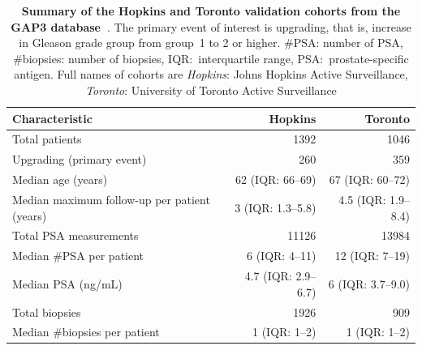 \begin{subappendices}
\begin{table}
\small
\centering
\caption{\textbf{Summary of the Hopkins and Toronto validation cohorts from the GAP3 database~\citep{gap3_2018}}. The primary event of interest is upgrading, that is, increase in Gleason grade group from group~1 to 2 or higher. \#PSA: number of PSA, \#biopsies: number of biopsies, IQR:~interquartile range, PSA:~prostate-specific antigen. Full names of cohorts are \textit{Hopkins}: Johns Hopkins Active Surveillance, \textit{Toronto}: University of Toronto Active Surveillance}
\label{c5:tab:gap3_summary_1}
\begin{tabular}{p{5cm}rr}
\hline
\textbf{Characteristic} & \textbf{Hopkins} & \textbf{Toronto}\\
\hline
Total patients & 1392 & 1046\\
Upgrading (primary event) & 260 & 359\\
\hline
Median age (years) & 62 (IQR: 66--69) & 67 (IQR: 60--72)\\
Median maximum follow-up per patient (years) &  3 (IQR: 1.3--5.8) & 4.5 (IQR: 1.9--8.4)\\
Total PSA measurements & 11126 & 13984\\
Median \#PSA per patient &  6 (IQR: 4--11) & 12 (IQR: 7--19)\\
Median PSA (ng/mL) & 4.7 (IQR: 2.9--6.7) & 6 (IQR: 3.7--9.0)\\
Total biopsies & 1926 & 909\\
Median \#biopsies per patient &  1 (IQR: 1--2) &  1 (IQR: 1--2)\\
\hline
\end{tabular}
\end{table}


\end{subappendices}
